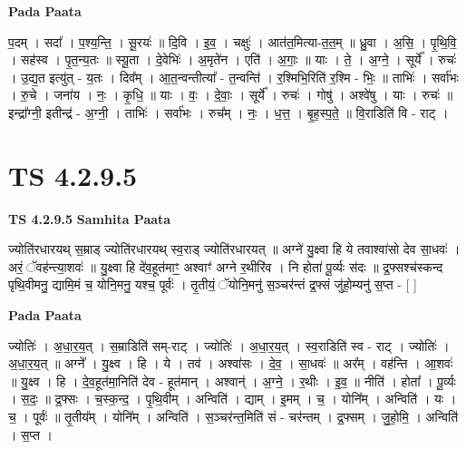 \documentclass[17pt]{extarticle}
\begin{document}
\textbf{Pada Paata} \newline

प॒दम् । सदा᳚ । प॒श्य॒न्ति॒ । सू॒रयः॑ ॥ दि॒वि । इ॒व॒ । चक्षुः॑ । आत॑त॒मित्या-त॒त॒म् ॥ ध्रु॒वा । अ॒सि॒ । पृ॒थि॒वि॒ । सह॑स्व । पृ॒त॒न्य॒तः ॥ स्यू॒ता । दे॒वेभिः॑ । अ॒मृते॑न । एति॑ । अ॒गाः॒ ॥ याः । ते॒ । अ॒ग्ने॒ । सूर्ये᳚ । रुचः॑ । उ॒द्य॒त इत्यु॑त् - य॒तः । दिव᳚म् । आ॒त॒न्वन्तीत्या᳚ - त॒न्वन्ति॑ । र॒श्मिभि॒रिति॑ र॒श्मि - भिः॒ ॥ ताभिः॑ । सर्वा॑भः । रु॒चे । जना॑य । नः॒ । कृ॒धि॒ ॥ याः । वः॒ । दे॒वाः॒ । सूर्ये᳚ । रुचः॑ । गोषु॑ । अश्वे॑षु । याः । रुचः॑ ॥ इन्द्रा᳚ग्नी॒ इतीन्द्र॑ - अ॒ग्नी॒ । ताभिः॑ । सर्वा॑भः । रुच᳚म् । नः॒ । ध॒त्त॒ । बृ॒ह॒स्प॒ते॒ ॥ वि॒राडिति॑ वि - राट् ।  \newline





\section{ TS 4.2.9.5 }

\textbf{TS 4.2.9.5 } \newline
\textbf{Samhita Paata} \newline

ज्योति॑रधारयथ् स॒म्राड् ज्योति॑रधारयथ् स्व॒राड् ज्योति॑रधारयत् ॥ अग्ने॑ यु॒क्ष्वा हि ये तवाश्वा॑सो देव सा॒धवः॑ । अरं॒ ॅवह॑न्त्या॒शवः॑ ॥ यु॒क्ष्वा हि दे॑व॒हूत॑माꣳ॒॒ अश्वाꣳ॑ अग्ने र॒थीरि॑व । नि होता॑ पू॒र्व्यः स॑दः ॥ द्र॒फ्सश्च॑स्कन्द पृथि॒वीमनु॒ द्यामि॒मं च॒ योनि॒मनु॒ यश्च॒ पूर्वः॑ । तृ॒तीयं॒ ॅयोनि॒मनु॑ स॒ञ्चर॑न्तं द्र॒फ्सं जु॑हो॒म्यनु॑ स॒प्त - [  ] \newline

\textbf{Pada Paata} \newline

ज्योतिः॑ । अ॒धा॒र॒य॒त् । स॒म्राडिति॑ सम्-राट् । ज्योतिः॑ । अ॒धा॒र॒य॒त् । स्व॒राडिति॑ स्व - राट् । ज्योतिः॑ । अ॒धा॒र॒य॒त् ॥ अग्ने᳚ । यु॒क्ष्व । हि । ये । तव॑ । अश्वा॑सः । दे॒व॒ । सा॒धवः॑ ॥ अर᳚म् । वह॑न्ति । आ॒शवः॑ ॥ यु॒क्ष्व । हि । दे॒व॒हूत॑मा॒निति॑ देव - हूत॑मान् । अश्वान्॑ । अ॒ग्ने॒ । र॒थीः । इ॒व॒ ॥ नीति॑ । होता᳚ । पू॒र्व्यः । स॒दः॒ ॥ द्र॒फ्सः । च॒स्क॒न्द॒ । पृ॒थि॒वीम् । अन्विति॑ । द्याम् । इ॒मम् । च॒ । योनि᳚म् । अन्विति॑ । यः । च॒ । पूर्वः॑ ॥ तृ॒तीय᳚म् । योनि᳚म् । अन्विति॑ । स॒ञ्चर॑न्त॒मिति॑ सं - चर॑न्तम् । द्र॒फ्सम् । जु॒हो॒मि॒ । अन्विति॑ । स॒प्त ।  \newline




\end{document}
